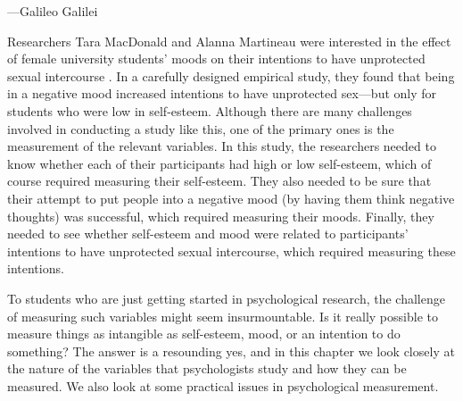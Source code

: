  {---Galileo Galilei}


Researchers Tara MacDonald and Alanna Martineau were interested in the effect of female university students' moods on their intentions to have unprotected sexual intercourse \citep{macdonald_self-esteem_2002}. In a carefully designed empirical study, they found that being in a negative mood increased intentions to have unprotected sex—but only for students who were low in self-esteem. Although there are many challenges involved in conducting a study like this, one of the primary ones is the measurement of the relevant variables. In this study, the researchers needed to know whether each of their participants had high or low self-esteem, which of course required measuring their self-esteem. They also needed to be sure that their attempt to put people into a negative mood (by having them think negative thoughts) was successful, which required measuring their moods. Finally, they needed to see whether self-esteem and mood were related to participants' intentions to have unprotected sexual intercourse, which required measuring these intentions.


To students who are just getting started in psychological research, the challenge of measuring such variables might seem insurmountable. Is it really possible to measure things as intangible as self-esteem, mood, or an intention to do something? The answer is a resounding yes, and in this chapter we look closely at the nature of the variables that psychologists study and how they can be measured. We also look at some practical issues in psychological measurement.

